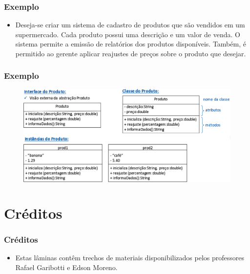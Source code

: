 \documentclass[aspectratio=169]{beamer}
\begin{document}
\begin{frame}\frametitle{Exemplo}
\begin{itemize}
	\item Deseja-se criar um sistema de cadastro de produtos que são vendidos em um supermercado. Cada produto possui uma descrição e um valor de venda. O sistema permite a emissão de relatórios dos produtos disponíveis. Também, é permitido ao gerente aplicar reajustes de preços sobre o produto que desejar.
\end{itemize}
\end{frame}

\begin{frame}\frametitle{Exemplo}
\begin{figure}[h]
	\centering
	\includegraphics[height=0.7\paperheight]{imagens/modelagem.png}
\end{figure}
\end{frame}

\section{Créditos}

\begin{frame}\frametitle{Créditos}
\begin{itemize}
	\item Estas lâminas contêm trechos de materiais disponibilizados pelos professores Rafael Garibotti e Edson Moreno.
\end{itemize}
\end{frame}

\end{document}

